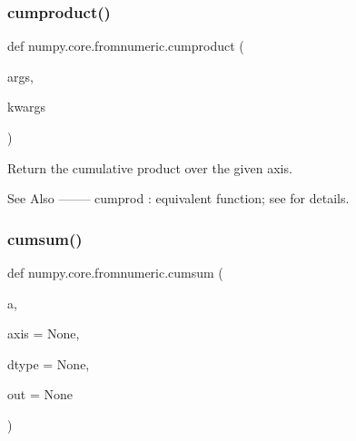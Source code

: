 \subsubsection{\texorpdfstring{cumproduct()}{cumproduct()}}
{\footnotesize\ttfamily def numpy.\+core.\+fromnumeric.\+cumproduct (\begin{DoxyParamCaption}\item[{}]{args,  }\item[{}]{kwargs }\end{DoxyParamCaption})}

\begin{DoxyVerb}Return the cumulative product over the given axis.

See Also
--------
cumprod : equivalent function; see for details.
\end{DoxyVerb}
 \mbox{\label{namespacenumpy_1_1core_1_1fromnumeric_a31c9fb5c7a09516669e2fcc4a3a60d0f}} 
\subsubsection{\texorpdfstring{cumsum()}{cumsum()}}
{\footnotesize\ttfamily def numpy.\+core.\+fromnumeric.\+cumsum (\begin{DoxyParamCaption}\item[{}]{a,  }\item[{}]{axis = {\ttfamily None},  }\item[{}]{dtype = {\ttfamily None},  }\item[{}]{out = {\ttfamily None} }\end{DoxyParamCaption})}

